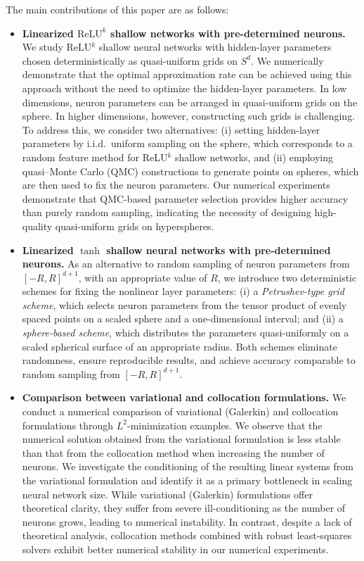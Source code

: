 \documentclass{article}
\theoremstyle{remark}
\begin{document}
\medskip
\noindent
The main contributions of this paper are as follows:
\begin{itemize}
  \item \textbf{Linearized $\text{ReLU}^k$ shallow networks with pre-determined neurons.}  
  We study ReLU$^k$ shallow neural networks with hidden-layer parameters chosen deterministically as quasi-uniform grids on $S^d$. 
  We numerically demonstrate that the optimal approximation rate can be achieved using this approach without the need to optimize the hidden-layer parameters. 
    In low dimensions, neuron parameters can be arranged in quasi-uniform grids on the sphere. 
    In higher dimensions, however, constructing such grids is challenging. 
    To address this, we consider two alternatives: 
    (i) setting hidden-layer parameters by i.i.d.\ uniform sampling on the sphere, 
    which corresponds to a random feature method for ReLU$^k$ shallow networks, and 
    (ii) employing quasi–Monte Carlo (QMC) constructions to generate points on spheres, which are then used to fix the neuron parameters. 
Our numerical experiments demonstrate that QMC-based parameter selection 
provides higher accuracy than purely random sampling, indicating the necessity of designing high-quality quasi-uniform grids on hyperspheres. 
  \item \textbf{Linearized $\tanh$ shallow neural networks with pre-determined neurons.}
As an alternative to random sampling of neuron parameters from $[-R,R]^{d+1}$, with an appropriate value of $R$, we introduce two deterministic schemes for fixing the nonlinear layer parameters:
(i) a \emph{Petrushev-type grid scheme}, which selects neuron parameters  from the tensor product of evenly spaced points on a scaled sphere and a one-dimensional interval; and
(ii) a \emph{sphere-based scheme}, which distributes the parameters quasi-uniformly on a scaled spherical surface of an appropriate radius. 
Both schemes eliminate randomness, ensure reproducible results, and achieve accuracy comparable to random sampling from $[-R,R]^{d+1}$.

  \item \textbf{Comparison between variational and collocation formulations.} 
  We conduct a numerical comparison of variational (Galerkin) and collocation formulations through $L^2$-minimization examples.  
  We observe that the numerical solution obtained from the variational formulation is less stable than that from the collocation method when increasing the number of neurons. 
  We investigate the conditioning of the resulting linear systems from the variational formulation 
and identify it as a primary bottleneck in scaling neural network size. 
While variational (Galerkin) formulations offer theoretical clarity, 
they suffer from severe ill-conditioning as the number of neurons grows, 
leading to numerical instability. 
In contrast, despite a lack of theoretical analysis, collocation methods combined with robust least-squares solvers exhibit better numerical stability in our numerical experiments.

\end{itemize}
\end{document}

